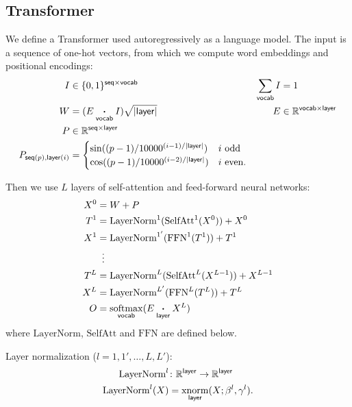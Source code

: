 \documentclass{article}
\newcommand{\reals}{\mathbb{R}}
\begin{document}
\subsection{Transformer}
\label{sec:transformer}

We define a Transformer used autoregressively as a language model.
The input is a sequence of one-hot vectors, from which we compute word embeddings and positional encodings:
\begin{align*}
  I &\in \{0, 1\}^{\name{seq} \times \name{vocab}} & \nsum{vocab} I &= 1 \\
  W &= (E \ndot{vocab} I)\sqrt{|\name{layer}|} & E &\in \reals^{\name{vocab} \times \name{layer}} \\
  P &\in \reals^{\name{seq} \times \name{layer}} \\
  P_{\nidx{seq}{p}, \nidx{layer}{i}} &= \begin{cases}
    \sin((p-1) / 10000^{(i-1) / |\name{layer}|}) & \text{$i$ odd} \\ 
    \cos((p-1) / 10000^{(i-2) / |\name{layer}|}) & \text{$i$ even.}
  \end{cases}
\end{align*}

Then we use $L$ layers of self-attention and feed-forward neural networks:
\begin{align*} 
X^0 &= W+P \\
T^1 &= \text{LayerNorm}^1(\text{SelfAtt}^1(X^0)) + X^0\\
X^1 &= \text{LayerNorm}^{1'}(\text{FFN}^1(T^1)) + T^1\\
&\vdotswithin{=} \\
T^{L} &= \text{LayerNorm}^L(\text{SelfAtt}^L(X^{L-1})) + X^{L-1}\\
X^{L} &= \text{LayerNorm}^{L'}(\text{FFN}^L(T^L)) + T^L\\
O &= \nfun{vocab}{softmax}(E \ndot{layer} X^L)
\end{align*}
where $\text{LayerNorm}$, $\text{SelfAtt}$ and $\text{FFN}$ are defined below.

Layer normalization ($l = 1, 1', \ldots, L, L'$):
\begin{align*}
  \text{LayerNorm}^l &\colon \mathbb{R}^{\name{layer}} \rightarrow \mathbb{R}^{\name{layer}} \\
  \text{LayerNorm}^l(X) &= \nfun{layer}{xnorm}(X; \beta^l, \gamma^l).
\end{align*}
\end{document}
